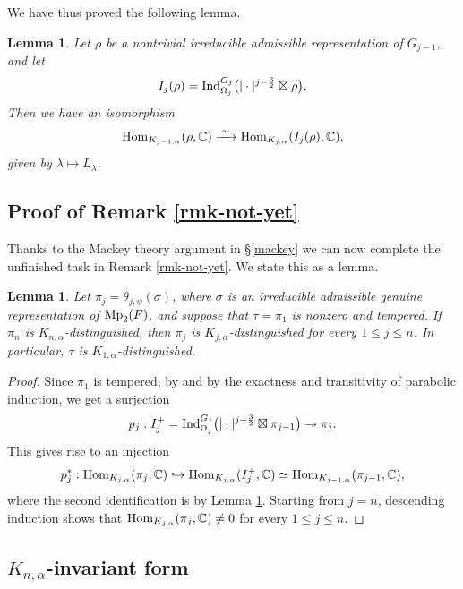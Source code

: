 \documentclass[12pt]{amsart}
\newtheorem{lemma}[theorem]{Lemma}%
\theoremstyle{definition}
\theoremstyle{remark}
\begin{document}
We have thus proved the following lemma.
\begin{lemma}\label{lemma-mackey}
Let $\rho$ be a nontrivial irreducible admissible representation of $G_{j-1}$, and let 
\[
I_j(\rho)=
{\rm Ind}_{\Omega_j}^{G_j}
\bigl(|\cdot|^{j-\frac{3}{2}}\boxtimes\rho\bigr).
\]
Then we have an isomorphism
\[
{\rm Hom}_{K_{j-1,\alpha}}(\rho,\mathbb C)
\xrightarrow{\;\sim\;}
{\rm Hom}_{K_{j,\alpha}}(I_j(\rho),\mathbb C),
\]
given by $\lambda\mapsto L_\lambda$.
\end{lemma}

\subsection{Proof of Remark \ref{rmk-not-yet}}\label{section-yet}

Thanks to the Mackey theory argument in \S \ref{mackey} we can now complete the unfinished task in Remark \ref{rmk-not-yet}. We state this as a lemma.

\begin{lemma}\label{lemma-yet}
Let $\pi_j=\theta_{j,\psi}(\sigma)$, where
$\sigma$ is an irreducible admissible genuine representation of ${\rm Mp}_2(F)$, 
and suppose that $\tau=\pi_1$ is nonzero and tempered. If $\pi_n$ is $K_{n,\alpha}$-distinguished, then $\pi_j$ is $K_{j,\alpha}$-distinguished for every $1\leq j\leq n$. In particular, $\tau$ is $K_{1,\alpha}$-distinguished.
\end{lemma}

\begin{proof}
Since $\pi_1$ is tempered, by \cite[Proposition 3.2]{gt16} and by the exactness and transitivity of parabolic induction, we get a surjection
\[
p_j:I_j^+ 
=
{\rm Ind}_{\Omega_j}^{G_j}
\bigl(|\cdot |^{j-\frac{3}{2}}\boxtimes \pi_{j-1} \bigr)
\twoheadrightarrow\pi_j.
\]
This gives rise to an injection
\begin{equation}\label{eq-injection}
p_j^*:
{\rm Hom}_{K_{j,\alpha}}(\pi_j,\mathbb C)
\hookrightarrow
{\rm Hom}_{K_{j,\alpha}}(I_j^+,\mathbb C) \simeq {\rm Hom}_{K_{j-1,\alpha}}(\pi_{j-1},\mathbb C),
\end{equation}
where the second identification is by Lemma \ref{lemma-mackey}.
Starting from $j=n$, descending induction shows that
${\rm Hom}_{K_{j,\alpha}}(\pi_j,\mathbb C)\ne0$
for every $1\le j\le n$.
\end{proof}

\subsection{$K_{n,\alpha}$-invariant form}\label{invariant}
\end{document}
